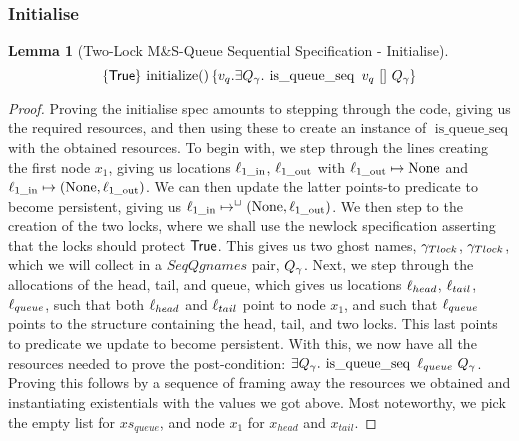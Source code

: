 \documentclass[a4paper, 11pt]{report}
\newtheorem{lemma}[theorem]{Lemma}
\newcommand{\initialise}{\operatorname{initialize}}
\newcommand{\isqueueseq}{\operatorname{is\_queue\_seq}}
\newcommand{\locin}[1]{\loc_{#1\_\text{in}}}
\newcommand{\locout}[1]{\loc_{#1\_\text{out}}}
\newcommand{\tlseqspecinit}{\hoare{\TRUE}{\initialise \TT}{v_q . \Exists Q_\gname. \isqueueseq\ v_q\ []\ Q_\gname}}
\begin{document}
\subsubsection{Initialise}
\begin{lemma}[Two-Lock M\&S-Queue Sequential Specification - Initialise]\label{TLMSQ:spec:seq:init}
  \begin{equation*}
    \tlseqspecinit
  \end{equation*}
\end{lemma}
\begin{proof}
Proving the initialise spec amounts to stepping through the code, giving us the required resources, and then using these to create an instance of $\isqueueseq$ with the obtained resources. To begin with, we step through the lines creating the first node $x_1$, giving us locations $\locin{1}$, $\locout{1}$ with $\locout{1} \mapsto \None$ and $\locin{1} \mapsto (\None, \locout{1})$. We can then update the latter points-to predicate to become persistent, giving us $\locin{1} \mapsto^{\persistently} (\None, \locout{1})$. We then step to the creation of the two locks, where we shall use the newlock specification asserting that the locks should protect $\textsf{True}$. This gives us two ghost names, $\gamma_{Tlock}$, $\gamma_{Tlock}$, which we will collect in a $SeqQgnames$ pair, $Q_\gamma$.
Next, we step through the allocations of the head, tail, and queue, which gives us locations $\ell_{head}$, $\ell_{tail}$, $\ell_{queue}$, such that both $\ell_{head}$ and $\ell_{tail}$ point to node $x_1$, and such that $\ell_{queue}$ points to the structure containing the head, tail, and two locks. This last points to predicate we update to become persistent.
With this, we now have all the resources needed to prove the post-condition: $\Exists Q_\gname . \isqueueseq \ \loc_{queue} \ Q_\gname$. Proving this follows by a sequence of framing away the resources we obtained and instantiating existentials with the values we got above. Most noteworthy, we pick the empty list for $xs_{queue}$, and node $x_1$ for $x_{head}$ and $x_{tail}$.
\end{proof}
\end{document}
